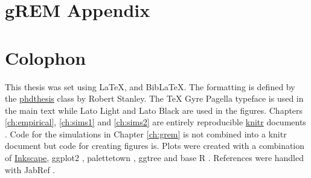 
\appendix
\chapter{gREM Appendix}
\label{gremAppendix}




\chapter{Colophon}
\label{appendixlabel3}


This thesis was set using \LaTeX, \XeLaTeX\vspace{1mm} and Bib\LaTeX. \vspace{-0.12cm} 
The formatting is defined by the \href{https://github.com/robjstan/latex-phdthesis}{phdthesis} class by Robert Stanley.
The TeX Gyre Pagella typeface is used in the main text while { Lato Light} and { \color[rgb]{0.75,0.75,0.75} Lato Black} are used in the figures.
Chapters \ref{ch:empirical}, \ref{ch:sims1} and \ref{ch:sims2} are entirely reproducible \href{http://yihui.name/knitr/}{knitr} documents \cite{knitr}.
Code for the simulations in Chapter \ref{ch:grem} is not combined into a knitr document but code for creating figures is.
Plots were created with a combination of \href{www.inkscape.org}{Inkscape}, ggplot2 \cite{ggplot2}, palettetown \cite{palettetown}, ggtree \cite{ggtree} and base R \cite{R}.
References were handled with JabRef \cite{JabRef_software}. 

